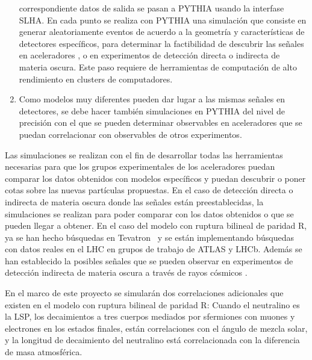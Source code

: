 \begin{enumerate}
  correspondiente datos de salida se pasan a PYTHIA usando la
  interfase SLHA. En cada punto se realiza con PYTHIA una simulación
  que consiste en generar aleatoriamente eventos de acuerdo a la
  geometría y características de detectores específicos, para
  determinar la factibilidad de descubrir las señales en aceleradores
  \cite{Magro:2003zb,deCampos:2005ri,deCampos:2007bn,deCampos:2008ic,deCampos:2008re},
  o en experimentos de detección directa o indirecta
  \cite{Choi:2010xn} de materia oscura. Este paso requiere de
  herramientas de computación de alto rendimiento en clusters de
  computadores.
  \label{item:8}
\item Como modelos muy diferentes pueden dar lugar a las mismas
  señales en detectores, se debe hacer también simulaciones en PYTHIA
  del nivel de precisión con el que se pueden determinar observables
  en aceleradores que se puedan correlacionar con observables de otros
  experimentos.
  \label{item:9}
\end{enumerate}

Las simulaciones se realizan con el fin de desarrollar todas las
herramientas necesarias para que los grupos experimentales de los
aceleradores puedan comparar los datos obtenidos con modelos
específicos y puedan descubrir o poner cotas sobre las nuevas
partículas propuestas. En el caso de detección directa o indirecta de
materia oscura donde las señales están preestablecidas, la
simulaciones se realizan para poder comparar con los datos obtenidos o
que se pueden llegar a obtener. En el caso del modelo con ruptura
bilineal de paridad R, ya se han hecho búsquedas en
Tevatron~\cite{Brigliadori:2008vf} y se están implementando búsquedas
con datos reales en el LHC en grupos de trabajo de ATLAS y
LHCb. Además se han establecido la posibles señales que se pueden
observar en experimentos de detección indirecta de materia oscura a
través de rayos cósmicos \cite{Choi:2010jt}.

\begin{proyecto}
  En el marco de este proyecto se simularán dos correlaciones
  adicionales que existen en el modelo con ruptura bilineal de paridad R:
  Cuando el neutralino es la LSP, los decaimientos a tres cuerpos
  mediados por sfermiones con muones y electrones en los estados
  finales, están correlaciones con el ángulo de mezcla solar, y la
  longitud de decaimiento del neutralino está correlacionada con la
  diferencia de masa atmosférica.
\end{proyecto}

